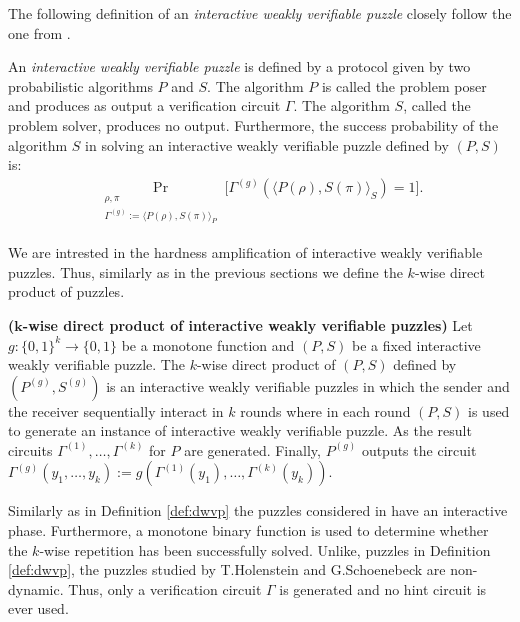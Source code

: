 The following definition of an \textit{interactive weakly verifiable puzzle} closely follow the one from \cite{DBLP:journals/corr/abs-1002-3534}.
\begin{definition}
An \textit{interactive weakly verifiable puzzle} is defined by a protocol given by two probabilistic algorithms $P$ and $S$.
The algorithm $P$ is called the problem poser and produces as output a verification circuit $\Gamma$.
The algorithm $S$, called the problem solver, produces no output.
Furthermore, the \textnormal{success probability} of the algorithm $S$ in solving an interactive weakly verifiable puzzle defined by $(P,S)$ is:
\begin{align*}
  \underset{\substack{\rho, \pi \\ \Gamma^{(g)} := \langle P(\rho), S(\pi) \rangle_{P}}}{\Pr}\Big[\Gamma^{(g)}(\langle P(\rho),S(\pi) \rangle_{S}) = 1 \Big].
\end{align*}
\end{definition}
We are intrested in the hardness amplification of interactive weakly verifiable puzzles. Thus, similarly as in the previous sections
we define the $k$-wise direct product of puzzles.
\begin{definition}\textbf{($\boldsymbol{k}$-wise direct product of interactive weakly verifiable puzzles)}
Let $g: \{0,1\}^{k} \rightarrow \{0,1\}$ be a monotone function and $(P,S)$ be a fixed interactive weakly verifiable puzzle.
The $k$-wise direct product of $(P,S)$ defined by $(P^{(g)}, S^{(g)})$ is an interactive weakly verifiable puzzles in which the sender and the receiver
sequentially interact in $k$ rounds where in each round $(P,S)$ is used to generate an instance of interactive weakly verifiable puzzle.
As the result circuits $\Gamma^{(1)}, \dotsc, \Gamma^{(k)}$ for $P$ are generated.
Finally, $P^{(g)}$ outputs the circuit $\Gamma^{(g)}(y_1, \dotsc, y_k) := g(\Gamma^{(1)}(y_1), \dotsc, \Gamma^{(k)}(y_k))$.
\end{definition}

Similarly as in Definition \ref{def:dwvp} the puzzles considered in \cite{DBLP:journals/corr/abs-1002-3534} have
an interactive phase. Furthermore, a monotone binary function is used to determine whether the $k$-wise repetition
has been successfully solved. Unlike, puzzles in Definition \ref{def:dwvp}, the puzzles studied by T.Holenstein and G.Schoenebeck
are non-dynamic. Thus, only a verification circuit $\Gamma$ is generated and no hint circuit is ever used.

